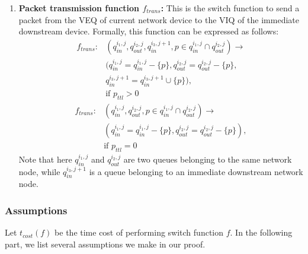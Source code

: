 \begin{enumerate}
	
	\item \textbf{Packet transmission function $ f_{trans}$:} This is the switch function to send a packet from the VEQ of current network device to the VIQ of the immediate downstream device. Formally, this function can be expressed as follows:
	\begin{align} \label{eqn:trans}
	f_{trans}: &(q_{in}^{i_1, j}, q_{out}^{i_2, j}, q_{in}^{i_3, j+1}, p\in q_{in}^{i_1,j}\cap q_{out}^{i_2,j})  \longrightarrow  \nonumber \\
 &	(q_{in}^{i_1,j}=q_{in}^{i_1,j}-\{p\}, q_{out}^{i_2,j}=q_{out}^{i_2,j}-\{p\}, \nonumber \\ 
 &	 q_{in}^{i_3,j+1}=q_{in}^{i_3,j+1}\cup\{p\}),  \nonumber \\
 & \text{if } p_{ttl} > 0   
 	\end{align}
 	\begin{align} 
 	f_{trans}: &(q_{in}^{i_1, j}, q_{out}^{i_2, j}, p\in q_{in}^{i_1,j}\cap q_{out}^{i_2,j})  \longrightarrow  \nonumber \\
 	&(q_{in}^{i_1,j}=q_{in}^{i_1,j}-\{p\}, q_{out}^{i_2,j}=q_{out}^{i_2,j}-\{p\}), \nonumber \\ 
 	& \text{if } p_{ttl} =0
	\end{align}
	Note that here  $q_{in}^{i_1, j}$ and $q_{out}^{i_2,j}$ are two queues belonging to the same network node, while $q_{in}^{i_3, j+1}$ is a queue belonging to an immediate downstream network node.
\end{enumerate}


\subsubsection{Assumptions}

Let $t_{cost}(f)$ be the time cost of performing switch function $f$. In the following part, we list several assumptions we make in our proof.

